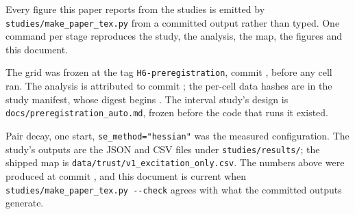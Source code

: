 Every figure this paper reports from the studies is emitted by
\texttt{studies/make\_paper\_tex.py} from a committed output rather than typed. One
command per stage reproduces the study, the analysis, the map, the figures and this
document.

The grid was frozen at the tag \texttt{H6-preregistration}, commit
\texttt{\detokenize{\HsixTagCommit}}, before any cell ran. The analysis is
attributed to commit \texttt{\detokenize{\HsixAnalysisCommit}}; the per-cell data
hashes are in the study manifest,
whose digest begins \HsixManifestDigest. The interval study's design is
\texttt{docs/preregistration\_auto.md}, frozen before the code that runs it existed.

Pair decay, one start, \texttt{se\_method="hessian"} was the measured configuration.
The study's outputs are the JSON and CSV files under
\texttt{studies/results/}; the shipped map is
\texttt{data/trust/v1\_excitation\_only.csv}. The numbers above were produced at
commit
\texttt{},
and this document is current when
\texttt{studies/make\_paper\_tex.py -{}-check} agrees with what the committed
outputs generate.
